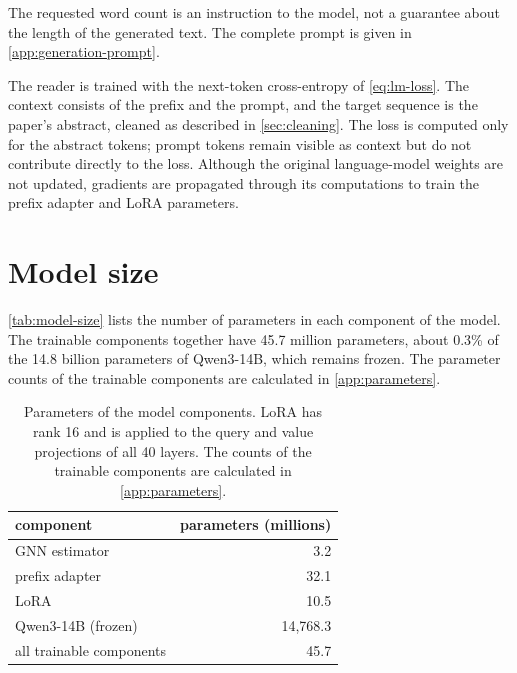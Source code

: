The requested word count is an instruction to the model, not a guarantee about the length of the generated text. The complete prompt is given in \autoref{app:generation-prompt}.

The reader is trained with the next-token cross-entropy of \autoref{eq:lm-loss}. The context consists of the prefix and the prompt, and the target sequence is the paper's abstract, cleaned as described in \autoref{sec:cleaning}. The loss is computed only for the abstract tokens; prompt tokens remain visible as context but do not contribute directly to the loss. Although the original language-model weights are not updated, gradients are propagated through its computations to train the prefix adapter and LoRA parameters.

\section{Model size}
\label{sec:model-size}

\autoref{tab:model-size} lists the number of parameters in each component of the model. The trainable components together have 45.7 million parameters, about 0.3\% of the 14.8 billion parameters of Qwen3-14B, which remains frozen. The parameter counts of the trainable components are calculated in \autoref{app:parameters}.

\begin{table}[!ht]
  \centering
  \begin{tabular}{@{}lr@{}}
    \toprule
    component & parameters (millions) \\
    \midrule
    GNN estimator & 3.2 \\
    prefix adapter & 32.1 \\
    LoRA & 10.5 \\
    Qwen3-14B (frozen) & 14,768.3 \\
    \midrule
    all trainable components & 45.7 \\
    \bottomrule
  \end{tabular}
  \caption{Parameters of the model components. LoRA has rank 16 and is applied to the query and value projections of all 40 layers. The counts of the trainable components are calculated in \autoref{app:parameters}.}
  \label{tab:model-size}
\end{table}

